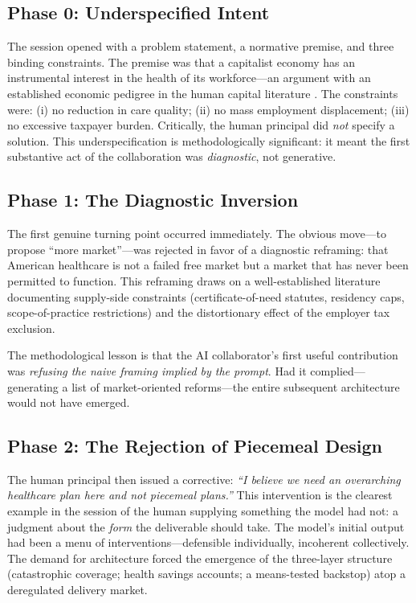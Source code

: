\documentclass[11pt,a4paper]{article}
\begin{document}
\subsection{Phase 0: Underspecified Intent}

The session opened with a problem statement, a normative premise, and three binding constraints. The premise was that a capitalist economy has an instrumental interest in the health of its workforce---an argument with an established economic pedigree in the human capital literature \citep{grossman1972}. The constraints were: (i) no reduction in care quality; (ii) no mass employment displacement; (iii) no excessive taxpayer burden. Critically, the human principal did \emph{not} specify a solution. This underspecification is methodologically significant: it meant the first substantive act of the collaboration was \emph{diagnostic}, not generative.

\subsection{Phase 1: The Diagnostic Inversion}

The first genuine turning point occurred immediately. The obvious move---to propose ``more market''---was rejected in favor of a diagnostic reframing: that American healthcare is not a failed free market but a market that has never been permitted to function. This reframing draws on a well-established literature documenting supply-side constraints (certificate-of-need statutes, residency caps, scope-of-practice restrictions) and the distortionary effect of the employer tax exclusion.

The methodological lesson is that the AI collaborator's first useful contribution was \emph{refusing the naive framing implied by the prompt}. Had it complied---generating a list of market-oriented reforms---the entire subsequent architecture would not have emerged.

\subsection{Phase 2: The Rejection of Piecemeal Design}

The human principal then issued a corrective: \emph{``I believe we need an overarching healthcare plan here and not piecemeal plans.''} This intervention is the clearest example in the session of the human supplying something the model had not: a judgment about the \emph{form} the deliverable should take. The model's initial output had been a menu of interventions---defensible individually, incoherent collectively. The demand for architecture forced the emergence of the three-layer structure (catastrophic coverage; health savings accounts; a means-tested backstop) atop a deregulated delivery market.
\end{document}
